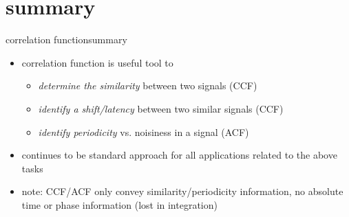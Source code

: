 \section{summary}
\begin{frame}{correlation function}{summary}
    \begin{itemize}
        \item   correlation function is useful tool to
            \begin{itemize}
                \item   \textit{determine the similarity} between two signals (CCF)
                \item   \textit{identify a shift/latency} between two similar signals (CCF)
                \item   \textit{identify periodicity} vs. noisiness in a signal (ACF)
            \end{itemize}
        \bigskip
        \item<2->   continues to be standard approach for all applications related to the above tasks
        \bigskip
        \item<3->   note: CCF/ACF only convey similarity/periodicity information, no absolute time or phase information (lost in integration)
    \end{itemize}
\end{frame}		

    


